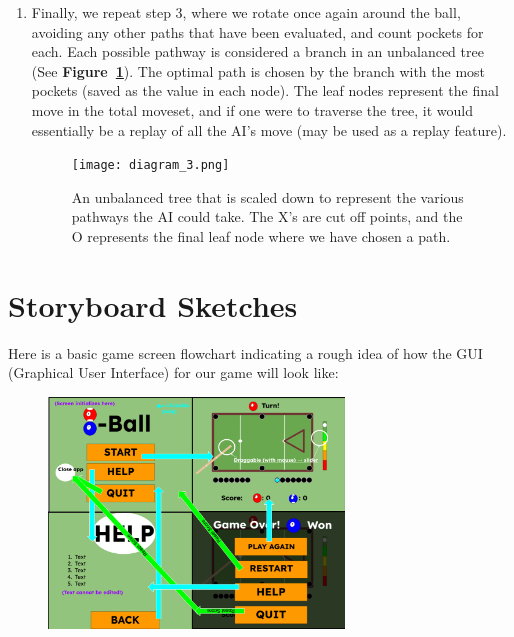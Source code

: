 \documentclass[12pt]{article}
\begin{document}
\begin{enumerate}
    \item Finally, we repeat step 3, where we rotate once again around the ball, avoiding any other paths that have been evaluated, and count pockets for each. Each possible pathway is considered a branch in an unbalanced tree (See \textbf{Figure~\ref{fig:tree}}). The optimal path is chosen by the branch with the most pockets (saved as the value in each node). The leaf nodes represent the final move in the total moveset, and if one were to traverse the tree, it would essentially be a replay of all the AI's move (may be used as a replay feature).

    \FloatBarrier
    \begin{figure}[htbp]
        \centering
        \texttt{[image: diagram\_3.png]}
        \caption{An unbalanced tree that is scaled down to represent the various pathways the AI could take. The X's are cut off points, and the O represents the final leaf node where we have chosen a path. }
        \label{fig:tree}
    \end{figure}
    \FloatBarrier
    
\end{enumerate}

\section{Storyboard Sketches}
Here is a basic game screen flowchart indicating a rough idea of how the GUI (Graphical User Interface) for our game will look like:

\FloatBarrier
\begin{figure}[htbp]
    \centering
    \includegraphics[width=0.7\textwidth]{diagram_flowchart.png}
    \label{fig:flowchart}
\end{figure}
\FloatBarrier
\end{document}
